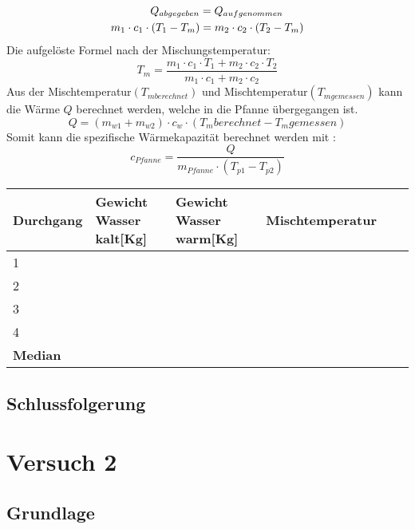 \documentclass{article}
\begin{document}
\begin{equation}
\begin{split}
 Q_{abgegeben} = Q_{aufgenommen}\hspace{0.655cm}\\
 m_1\cdot c_1\cdot (T_1-T_m)=m_2\cdot c_2\cdot (T_2-T_m)
\end{split}
\end{equation}
Die aufgelöste Formel nach der Mischungstemperatur:
\begin{equation}
	T_m = \frac{m_1\cdot c_1\cdot T_1+m_2\cdot c_2\cdot T_2}{m_1\cdot c_1+m_2\cdot c_2}
\end{equation}
Aus der Mischtemperatur$(T_{mberechnet})$ und Mischtemperatur$(T_{mgemessen})$ kann die Wärme $Q$ berechnet werden, welche in die Pfanne übergegangen ist.
\begin{equation}
 Q = (m_{w1}+m_{w2}) \cdot c_w \cdot (T_m{berechnet}-T_m{gemessen})
\end{equation}
Somit kann die spezifische Wärmekapazität berechnet werden mit :
\begin{equation}
	c_{Pfanne} = \frac{Q}{m_{Pfanne} \cdot (T_{p1}-T_{p2}) }
\end{equation}
\begin{table}[h]
    \begin{tabular}{|l|l|l|l|l|l|}
        \hline
  
        \textbf{Durchgang} &\textbf{Gewicht Wasser kalt[Kg]} &\textbf{Gewicht Wasser warm[Kg]} & \textbf{Mischtemperatur}\\ \hline
        1         &  &  & &  &  \\ 
        2         &  &  & &  &  \\ 
        3         &  &  &  &  & \\ 
        4         &  &  & &  &  \\ \hline
        \textbf{Median}         &  &  & && \\ 
        \hline
    \end{tabular}
\end{table}

\subsection*{Schlussfolgerung}
\section{Versuch 2}
\subsection{Grundlage}
\end{document}
